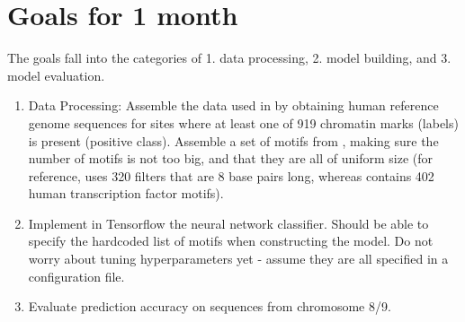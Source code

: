 \documentclass[11pt]{amsart}
\begin{document}
\section{Goals for 1 month}
The goals fall into the categories of 1. data processing, 2. model building, and 3. model evaluation.
\begin{enumerate}
\item Data Processing: Assemble the data used in \cite{zhou2015predicting} by obtaining human reference genome sequences for sites where at least one of 919 chromatin marks (labels) is present (positive class).  Assemble a set of motifs from \cite{doi:10.1093/nar/gkx1106}, making sure the number of motifs is not too big, and that they are all of uniform size (for reference, \cite{zhou2015predicting} uses 320 filters that are 8 base pairs long, whereas \cite{doi:10.1093/nar/gkx1106} contains 402 human transcription factor motifs).
\item Implement in Tensorflow the neural network classifier.  Should be able to specify the hardcoded list of motifs when constructing the model.  Do not worry about tuning hyperparameters yet - assume they are all specified in a configuration file.
\item Evaluate prediction accuracy on sequences from chromosome 8/9.
\end{enumerate}



\end{document}
